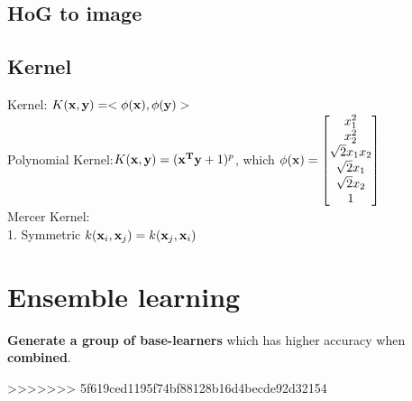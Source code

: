 \documentclass[12pt,a4paper]{article}
\begin{document}
\subsection*{HoG to image}
\subsection*{Kernel}
Kernel: $K({\bf x,y})= <\phi({\bf x}),\phi({\bf y})>$\\
Polynomial Kernel:$K({\bf x,y})=({\bf x^Ty}+1)^p$, which $\phi({\bf x}) = \left[\begin{matrix}
x_1^2\\x_2^2\\ \sqrt2x_1x_2 \\ \sqrt2x_1 \\ \sqrt2x_2 \\ 1
\end{matrix}\right]$\\
Mercer Kernel:\\
1. Symmetric $k({\bf x}_i,{\bf x}_j) = k({\bf x}_j,{\bf x}_i)$
\section*{Ensemble learning}
\textbf{Generate a group of base-learners} which has higher accuracy when \textbf{combined}.

>>>>>>> 5f619ced1195f74bf88128b16d4becde92d32154
\end{document}
